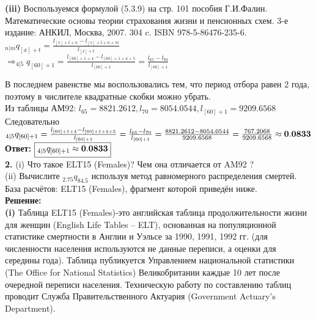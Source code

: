 \documentclass{article}
\begin{document}
{\bf \large  (iii)} Воспользуемся формулой (5.3.9) на стр. 101 пособия Г.И.Фалин. Математические основы теории страхования жизни и
пенсионных схем. 3-е издание: АНКИЛ, Москва, 2007. 304 c. ISBN 978-5-86476-235-6.\\

$_{n|m}q_{[x] + t} = \frac{     l_{[x]+t+n} -  l_{[x]+t+n+m}   }{     l_{[x]+t}}$\\

$\Rightarrow  _{4|5}q_{[60] + 1} = \frac{     l_{[60]+1+4} -  l_{[60]+1+4+5}   }{     l_{[60]+1} } = \frac {  l_{65} - l_{70}   }{    l_{[60]+1} }   $

В последнем равенстве мы воспользовались тем, что период отбора равен 2 года, поэтому в числителе квадратные скобки можно убрать.\\

Из таблицы АМ92: $   l_{65}=8821.2612,  l_{70}=8054.0544,  l_{[60]+1} = 9209.6568$\\

Следовательно\\

$ _{4|5}q_{[60] + 1} = \frac{     l_{[60]+1+4} -  l_{[60]+1+4+5}   }{     l_{[60]+1} } = \frac {  l_{65} - l_{70}   }{    l_{[60]+1} }  
 =   \frac {  8821.2612 -  8054.0544  }{     9209.6568 }  =   \frac {  767.2068  }{     9209.6568 }  \approx \bf 0.0833 $\\ 
 {\bf \large  Ответ:} $\boxed { _{4|5}q_{[60] + 1} \approx \bf 0.0833} $\\



{\bf \large 2.}  (i) Что такое ELT15 (Females)? Чем она отличается от AM92 ?\\
(ii) Вычислите $_{2.75}q_{84.5 }$ используя метод равномерного распределения смертей.\\
База расчётов: ELT15 (Females), фрагмент которой приведён ниже.\\
{\bf \large Решение:}\\
{\bf \large  (i)} Таблица ELT15 (Females)-это английская таблица продолжительности жизни  для женщин (English Life Tables – ELT),
основанная на популяционной статистике смертности в Англии и Уэльсе за 1990, 1991, 1992 гг. (для численности населения используются не данные переписи, а оценки для середины года).  Таблица публикуется Управлением национальной статистики (The Office for National Statistics) Великобритании каждые 10 лет после очередной переписи населения. Техническую работу по составлению таблиц проводит Служба Правительственного Актуария (Government Actuary’s Department).\\
\end{document}
